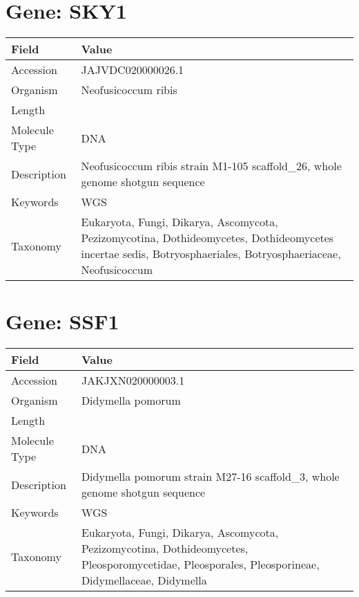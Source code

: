 \documentclass[10pt]{article}
\begin{document}
\section{Gene: SKY1}
{\footnotesize
\begin{longtable}{>{\raggedright\arraybackslash}p{4.5cm} >{\raggedright\arraybackslash}p{11.5cm}}
\textbf{Field} & \textbf{Value} \\
\hline
Accession & JAJVDC020000026.1 \\
Organism & Neofusicoccum ribis \\
Length & 307156 \\
Molecule Type & DNA \\
Description & Neofusicoccum ribis strain M1-105 scaffold\_26, whole genome shotgun sequence \\
Keywords & WGS \\
Taxonomy & Eukaryota, Fungi, Dikarya, Ascomycota, Pezizomycotina, Dothideomycetes, Dothideomycetes incertae sedis, Botryosphaeriales, Botryosphaeriaceae, Neofusicoccum \\
\end{longtable}
}

\vspace{1em}
\section{Gene: SSF1}
{\footnotesize
\begin{longtable}{>{\raggedright\arraybackslash}p{4.5cm} >{\raggedright\arraybackslash}p{11.5cm}}
\textbf{Field} & \textbf{Value} \\
\hline
Accession & JAKJXN020000003.1 \\
Organism & Didymella pomorum \\
Length & 1050547 \\
Molecule Type & DNA \\
Description & Didymella pomorum strain M27-16 scaffold\_3, whole genome shotgun sequence \\
Keywords & WGS \\
Taxonomy & Eukaryota, Fungi, Dikarya, Ascomycota, Pezizomycotina, Dothideomycetes, Pleosporomycetidae, Pleosporales, Pleosporineae, Didymellaceae, Didymella \\
\end{longtable}
}

\vspace{1em}
\end{document}
